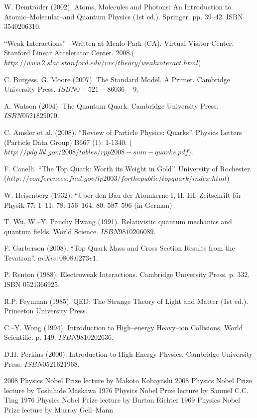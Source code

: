 \documentclass[12pt]{article}
\theoremstyle{plain}
\theoremstyle{definition}
\numberwithin{equation}{section}
\begin{document}
\begin{thebibliography}{99}
W. Demtr\"{o}der (2002). Atoms, Molecules and Photons: An Introduction to Atomic--Molecular--and Quantum Physics (1st ed.). Springer. pp. 39--42. ISBN 3540206310.

``Weak Interactions'' --Written at Menlo Park (CA). Virtual Visitor Center. Stanford Linear Accelerator Center. 2008.($http://www2.slac.stanford.edu/vvc/theory/weakinteract.html$)

C. Burgess, G. Moore (2007). The Standard Model. A Primer. Cambridge University Press. $ISBN 0-521-86036-9$.

A. Watson (2004). The Quantum Quark. Cambridge University Press. $ISBN 0521829070$.

C. Amsler et al. (2008). ``Review of Particle Physics: Quarks''.
Physics Letters (Particle Data Group) B667 (1): 1-1340. ($http://pdg.lbl.gov/2008/tables/rpp2008-sum-quarks.pdf$).

F. Canelli. ``The Top Quark: Worth its Weight in Gold''. University of Rochester. ($http://conferences.fnal.gov/lp2003/forthepublic/topquark/index.html$)

W. Heisenberg (1932). ``\"{U}ber den Bau der Atomkerne I, II, III. Zeitschrift f\"ur Physik 77: 1--11; 78: 156--164; 80: 587--596 (in German)

T. Wu, W.--Y. Pauchy Hwang (1991). Relativistic quantum mechanics and quantum fields. World Science. $ISBN 9810206089$.

F. Garberson (2008). ``Top Quark Mass and Cross Section Results from the Tevatron''. $arXiv: 0808.0273v1$.

P. Renton (1988). Electroweak Interactions. Cambridge University Press. p. 332. ISBN 0521366925.

R.P. Feynman (1985). QED: The Strange Theory of Light and Matter (1st ed.). Princeton University Press.

C.--Y. Wong (1994). Introduction to High--energy Heavy--ion Collisions. World Scientific. p. 149. $ISBN 9810202636$.

D.H. Perkins (2000). Introduction to High Energy Physics. Cambridge University Press. $ISBN 0521621968$.

2008 Physics Nobel Prize lecture by Makoto Kobayashi
2008 Physics Nobel Prize lecture by Toshihide Maskawa
1976 Physics Nobel Prize lecture by Samuel C.C. Ting
1976 Physics Nobel Prize lecture by Burton Richter
1969 Physics Nobel Prize lecture by Murray Gell--Mann

\end{thebibliography}

\end{document}
